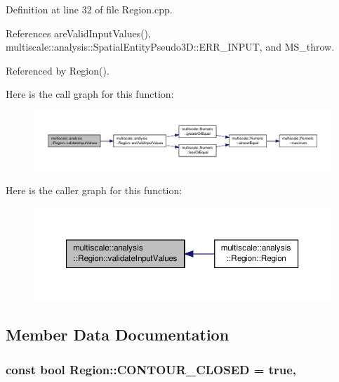 Definition at line 32 of file Region.\-cpp.



References are\-Valid\-Input\-Values(), multiscale\-::analysis\-::\-Spatial\-Entity\-Pseudo3\-D\-::\-E\-R\-R\-\_\-\-I\-N\-P\-U\-T, and M\-S\-\_\-throw.



Referenced by Region().



Here is the call graph for this function\-:\nopagebreak
\begin{figure}[H]
\begin{center}
\leavevmode
\includegraphics[width=350pt]{classmultiscale_1_1analysis_1_1Region_a517b46fd89696f44086aafb1a9526995_cgraph}
\end{center}
\end{figure}




Here is the caller graph for this function\-:\nopagebreak
\begin{figure}[H]
\begin{center}
\leavevmode
\includegraphics[width=350pt]{classmultiscale_1_1analysis_1_1Region_a517b46fd89696f44086aafb1a9526995_icgraph}
\end{center}
\end{figure}




\subsection{Member Data Documentation}
\hypertarget{classmultiscale_1_1analysis_1_1Region_a52c0c66ccfe38dc19379abaeba529f19}{
\subsubsection[{C\-O\-N\-T\-O\-U\-R\-\_\-\-C\-L\-O\-S\-E\-D}]{\setlength{\rightskip}{0pt plus 5cm}const bool Region\-::\-C\-O\-N\-T\-O\-U\-R\-\_\-\-C\-L\-O\-S\-E\-D = true\hspace{0.3cm}{\ttfamily [static]}, {\ttfamily [private]}}}\label{classmultiscale_1_1analysis_1_1Region_a52c0c66ccfe38dc19379abaeba529f19}


